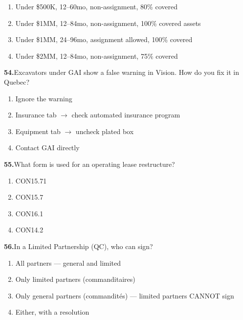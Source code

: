 \documentclass[11pt,letterpaper]{article}
\newif\ifshowsolutions
\newcommand{\answer}[1]{%
  \ifshowsolutions
    \begin{tcolorbox}[colback=green!5!white, colframe=answergreen, title={\small\textbf{Answer}}, fonttitle=\color{white}, coltitle=white, colbacktitle=answergreen, boxrule=0.5pt, arc=2pt, left=4pt, right=4pt, top=2pt, bottom=2pt]
    {\small #1}
    \end{tcolorbox}
  \fi
}
\begin{document}
\begin{enumerate}[label=\Alph*), leftmargin=2em, itemsep=0pt]
\item Under \$500K, 12--60mo, non-assignment, 80\% covered
\item Under \$1MM, 12--84mo, non-assignment, 100\% covered assets
\item Under \$1MM, 24--96mo, assignment allowed, 100\% covered
\item Under \$2MM, 12--84mo, non-assignment, 75\% covered
\end{enumerate}
\answer{B) ALL 4 must be met: $<$\$1MM, 12--84 months, non-assignment, 100\% covered assets.}

\vspace{0.5em}

\noindent\textbf{54.}\quad Excavators under GAI show a false warning in Vision. How do you fix it in Quebec?

\begin{enumerate}[label=\Alph*), leftmargin=2em, itemsep=0pt]
\item Ignore the warning
\item Insurance tab $\rightarrow$ check automated insurance program
\item Equipment tab $\rightarrow$ uncheck plated box
\item Contact GAI directly
\end{enumerate}
\answer{B) Insurance tab $\rightarrow$ check automated insurance program (Quebec). Other provinces: Equipment tab $\rightarrow$ uncheck plated box.}

\vspace{0.5em}

\noindent\textbf{55.}\quad What form is used for an operating lease restructure?

\begin{enumerate}[label=\Alph*), leftmargin=2em, itemsep=0pt]
\item CON15.71
\item CON15.7
\item CON16.1
\item CON14.2
\end{enumerate}
\answer{B) CON15.7 = operating lease. CON15.71 = capital lease restructure.}

\vspace{0.5em}

\noindent\textbf{56.}\quad In a Limited Partnership (QC), who can sign?

\begin{enumerate}[label=\Alph*), leftmargin=2em, itemsep=0pt]
\item All partners --- general and limited
\item Only limited partners (commanditaires)
\item Only general partners (commandit\'{e}s) --- limited partners CANNOT sign
\item Either, with a resolution
\end{enumerate}
\answer{C) ONLY general partners (commandit\'{e}s). Limited partners (commanditaires) CANNOT sign.}
\end{document}
